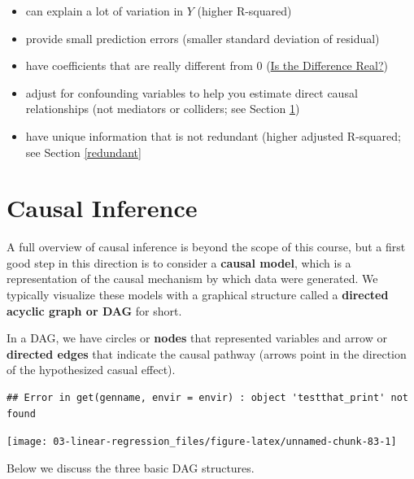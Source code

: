 \documentclass[
]{book}
\providecommand{\tightlist}{%
  \setlength{\itemsep}{0pt}\setlength{\parskip}{0pt}}
\begin{document}
\begin{itemize}
\tightlist
\item
  can explain a lot of variation in \(Y\) (higher R-squared)
\item
  provide small prediction errors (smaller standard deviation of residual)
\item
  have coefficients that are really different from 0 (\protect\hyperlink{is-the-difference-real}{Is the Difference Real?})
\item
  adjust for confounding variables to help you estimate direct causal relationships (not mediators or colliders; see Section \ref{dag})
\item
  have unique information that is not redundant (higher adjusted R-squared; see Section \ref{redundant}
\end{itemize}

\hypertarget{dag}{%
\section{Causal Inference}\label{dag}}

A full overview of causal inference is beyond the scope of this course, but a first good step in this direction is to consider a \textbf{causal model}, which is a representation of the causal mechanism by which data were generated. We typically visualize these models with a graphical structure called a \textbf{directed acyclic graph or DAG} for short.

In a DAG, we have circles or \textbf{nodes} that represented variables and arrow or \textbf{directed edges} that indicate the causal pathway (arrows point in the direction of the hypothesized casual effect).

\begin{verbatim}
## Error in get(genname, envir = envir) : object 'testthat_print' not found
\end{verbatim}

\begin{center}\texttt{[image: 03-linear-regression\_files/figure-latex/unnamed-chunk-83-1]} \end{center}

Below we discuss the three basic DAG structures.
\end{document}
